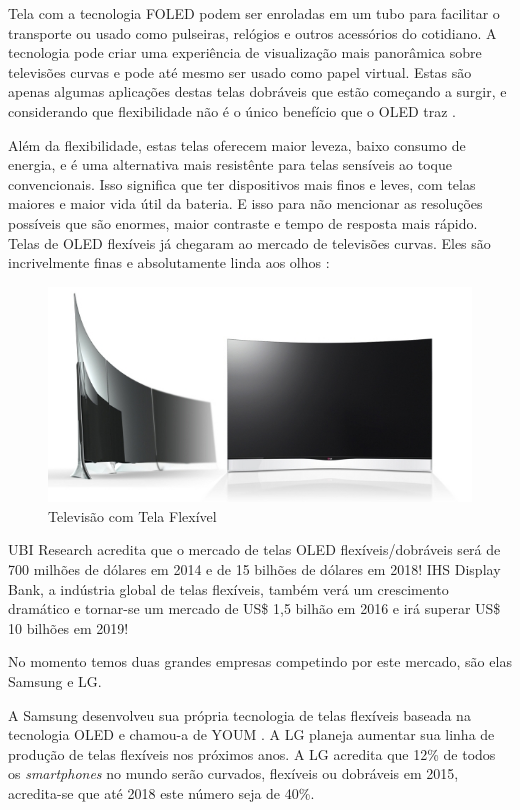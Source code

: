 Tela com a tecnologia FOLED podem ser enroladas em um tubo para facilitar o transporte ou usado como pulseiras, relógios e outros acessórios do cotidiano. A tecnologia pode criar uma experiência de visualização mais panorâmica sobre televisões curvas e pode até mesmo ser usado como papel virtual. Estas são apenas algumas aplicações destas telas dobráveis ​​que estão começando a surgir, e considerando que flexibilidade não é o único benefício que o OLED traz \cite{FSIJS}.

Além da flexibilidade, estas telas oferecem maior leveza, baixo consumo de energia, e é uma alternativa mais resistênte para telas sensíveis ao toque convencionais. Isso significa que ter dispositivos mais finos e leves, com telas maiores e maior vida útil da bateria. E isso para não mencionar as resoluções possíveis que são enormes, maior contraste e tempo de resposta mais rápido. Telas de OLED flexíveis já chegaram ao mercado de televisões curvas. Eles são incrivelmente finas e absolutamente linda aos olhos \cite{FSIJS}:

\begin{figure}[!h]
  \centering
  \includegraphics[width=.40\textwidth]{./figuras/flexible-tv} 
  \caption{Televisão com Tela Flexível}
  \label{fig:flexible-tv} 
\end{figure}

UBI Research acredita que o mercado de telas OLED flexíveis/dobráveis será de 700 milhões de dólares em 2014 e de 15 bilhões de dólares em 2018! IHS Display Bank, a indústria global de telas flexíveis, também verá um crescimento dramático e tornar-se um mercado de US\$ 1,5 bilhão em 2016 e irá superar US\$ 10 bilhões em 2019! \cite{NOLEDDN}

No momento temos duas grandes empresas competindo por este mercado, são elas Samsung e LG.

A Samsung desenvolveu sua própria tecnologia de telas flexíveis baseada na tecnologia OLED e chamou-a de YOUM \cite{SYOUM}. A LG planeja aumentar sua linha de produção de telas flexíveis nos próximos anos. A LG acredita que 12\% de todos os \textit{smartphones} no mundo serão curvados, flexíveis ou dobráveis em 2015, acredita-se que até 2018 este número seja de 40\%.



